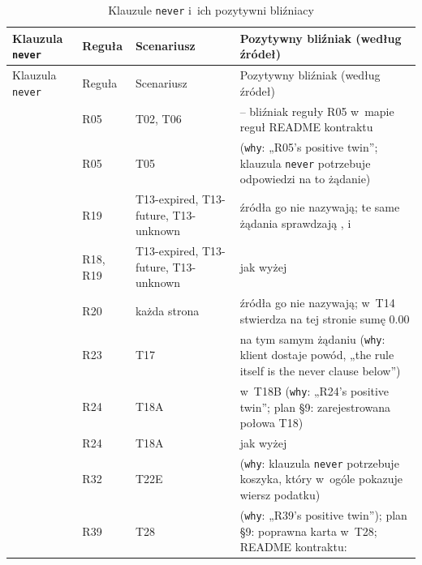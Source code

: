 {\footnotesize
\begin{xltabular}{\linewidth}{@{}>{\raggedright\arraybackslash}p{3.6cm} l >{\raggedright\arraybackslash}p{2.2cm} >{\raggedright\arraybackslash}X@{}}
\caption{Klauzule \texttt{never} i~ich pozytywni bliźniacy}\label{tab:klauzule-blizniaki}\\
\toprule
Klauzula \texttt{never} & Reguła & Scenariusz & Pozytywny bliźniak (według źródeł) \\
\midrule
\endfirsthead
\toprule
Klauzula \texttt{never} & Reguła & Scenariusz & Pozytywny bliźniak (według źródeł) \\
\midrule
\endhead
\bottomrule
\endlastfoot
{} & R05 & T02, T06 &  -- bliźniak
  reguły R05 w~mapie reguł README kontraktu \\
 & R05 & T05 & 
  (\texttt{why}: „R05's positive twin”; klauzula \texttt{never} potrzebuje odpowiedzi na to
  żądanie) \\
 & R19 & T13-expired, T13-future, T13-unknown & źródła go
  nie nazywają; te same żądania sprawdzają ,
   i~ \\
 & R18, R19 & T13-expired, T13-future, T13-unknown &
  jak wyżej \\
 & R20 & każda strona  & źródła go nie nazywają;
  w~T14  stwierdza na tej stronie sumę 0.00 \\
 & R23 & T17 &  na
  tym samym żądaniu (\texttt{why}: klient dostaje powód, „the rule itself is the never clause
  below”) \\
 & R24 & T18A & 
  w~T18B (\texttt{why}: „R24's positive twin”; plan §9: zarejestrowana połowa T18) \\
 & R24 & T18A & jak wyżej \\
 & R32 & T22E &  (\texttt{why}:
  klauzula \texttt{never} potrzebuje koszyka, który w~ogóle pokazuje wiersz podatku) \\
 & R39 & T28 & 
  (\texttt{why}: „R39's positive twin”); plan §9: poprawna karta w~T28; README kontraktu:

\end{xltabular}}
